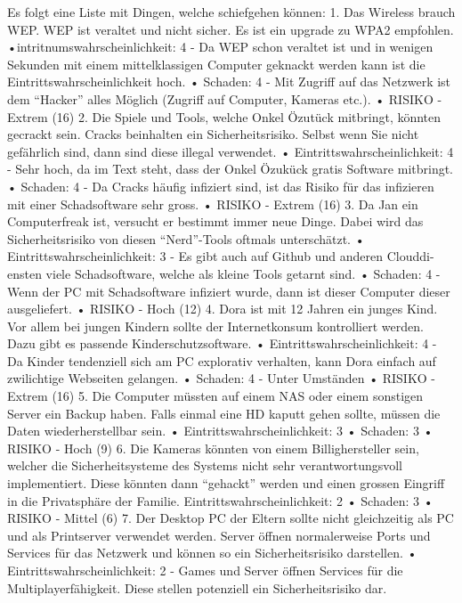 \documentclass{article}
\begin{document}
Es folgt eine Liste mit Dingen, welche schiefgehen können:
1. Das Wireless brauch WEP. WEP ist veraltet und nicht sicher. Es ist ein upgrade
zu WPA2 empfohlen.
•intritnumswahrscheinlichkeit: 4 - Da WEP schon veraltet ist und in wenigen
Sekunden mit einem mittelklassigen Computer geknackt werden kann ist die
Eintrittswahrscheinlichkeit hoch.
• Schaden: 4 - Mit Zugriff auf das Netzwerk ist dem “Hacker” alles Möglich
(Zugriff auf Computer, Kameras etc.).
• RISIKO - Extrem (16)
2. Die Spiele und Tools, welche Onkel Özutück mitbringt, könnten gecrackt sein.
Cracks beinhalten ein Sicherheitsrisiko. Selbst wenn Sie nicht gefährlich sind, dann
sind diese illegal verwendet.
• Eintrittswahrscheinlichkeit: 4 - Sehr hoch, da im Text steht, dass der Onkel
Özukück gratis Software mitbringt.
• Schaden: 4 - Da Cracks häufig infiziert sind, ist das Risiko für das infizieren
mit einer Schadsoftware sehr gross.
• RISIKO - Extrem (16)
3. Da Jan ein Computerfreak ist, versucht er bestimmt immer neue Dinge. Dabei
wird das Sicherheitsrisiko von diesen “Nerd”-Tools oftmals unterschätzt.
• Eintrittswahrscheinlichkeit: 3 - Es gibt auch auf Github und anderen Clouddi-
ensten viele Schadsoftware, welche als kleine Tools getarnt sind.
• Schaden: 4 - Wenn der PC mit Schadsoftware infiziert wurde, dann ist dieser
Computer dieser ausgeliefert.
• RISIKO - Hoch (12)
4. Dora ist mit 12 Jahren ein junges Kind. Vor allem bei jungen Kindern sollte der
Internetkonsum kontrolliert werden. Dazu gibt es passende Kinderschutzsoftware.
• Eintrittswahrscheinlichkeit: 4 - Da Kinder tendenziell sich am PC explorativ
verhalten, kann Dora einfach auf zwilichtige Webseiten gelangen.
• Schaden: 4 - Unter Umständen
• RISIKO - Extrem (16)
5. Die Computer müssten auf einem NAS oder einem sonstigen Server ein Backup
haben. Falls einmal eine HD kaputt gehen sollte, müssen die Daten wiederherstellbar
sein.
• Eintrittswahrscheinlichkeit: 3
• Schaden: 3
• RISIKO - Hoch (9)
6. Die Kameras könnten von einem Billighersteller sein, welcher die Sicherheitsysteme
des Systems nicht sehr verantwortungsvoll implementiert. Diese könnten dann
“gehackt” werden und einen grossen Eingriff in die Privatsphäre der Familie.
Eintrittswahrscheinlichkeit: 2
• Schaden: 3
• RISIKO - Mittel (6)
7. Der Desktop PC der Eltern sollte nicht gleichzeitig als PC und als Printserver
verwendet werden. Server öffnen normalerweise Ports und Services für das Netzwerk
und können so ein Sicherheitsrisiko darstellen.
• Eintrittswahrscheinlichkeit: 2 - Games und Server öffnen Services für die
Multiplayerfähigkeit. Diese stellen potenziell ein Sicherheitsrisiko dar.
\end{document}
